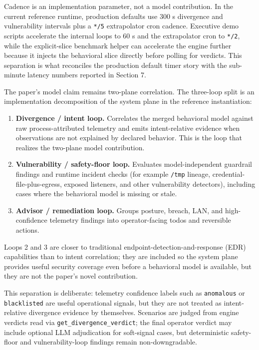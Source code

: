 \documentclass[
]{article}
\providecommand{\tightlist}{%
  \setlength{\itemsep}{0pt}\setlength{\parskip}{0pt}}
\begin{document}
Cadence is an implementation parameter, not a model contribution. In the
current reference runtime, production defaults use 300 s divergence and
vulnerability intervals plus a \texttt{*/5} extrapolator cron cadence.
Executive demo scripts accelerate the internal loops to 60 s and the
extrapolator cron to \texttt{*/2}, while the explicit-slice benchmark
helper can accelerate the engine further because it injects the
behavioral slice directly before polling for verdicts. This separation
is what reconciles the production default timer story with the
sub-minute latency numbers reported in Section 7.

The paper's model claim remains two-plane correlation. The three-loop
split is an implementation decomposition of the system plane in the
reference instantiation:

\begin{enumerate}
\def\labelenumi{\arabic{enumi}.}
\tightlist
\item
  \textbf{Divergence / intent loop.} Correlates the merged behavioral
  model against raw process-attributed telemetry and emits
  intent-relative evidence when observations are not explained by
  declared behavior. This is the loop that realizes the two-plane model
  contribution.
\item
  \textbf{Vulnerability / safety-floor loop.} Evaluates
  model-independent guardrail findings and runtime incident checks (for
  example \texttt{/tmp} lineage, credential-file-plus-egress, exposed
  listeners, and other vulnerability detectors), including cases where
  the behavioral model is missing or stale.
\item
  \textbf{Advisor / remediation loop.} Groups posture, breach, LAN, and
  high-confidence telemetry findings into operator-facing todos and
  reversible actions.
\end{enumerate}

Loops 2 and 3 are closer to traditional endpoint-detection-and-response
(EDR) capabilities than to intent correlation; they are included so the
system plane provides useful security coverage even before a behavioral
model is available, but they are not the paper's novel contribution.

This separation is deliberate: telemetry confidence labels such as
\texttt{anomalous} or \texttt{blacklisted} are useful operational
signals, but they are not treated as intent-relative divergence evidence
by themselves. Scenarios are judged from engine verdicts read via
\texttt{get\_divergence\_verdict}; the final operator verdict may
include optional LLM adjudication for soft-signal cases, but
deterministic safety-floor and vulnerability-loop findings remain
non-downgradable.
\end{document}
